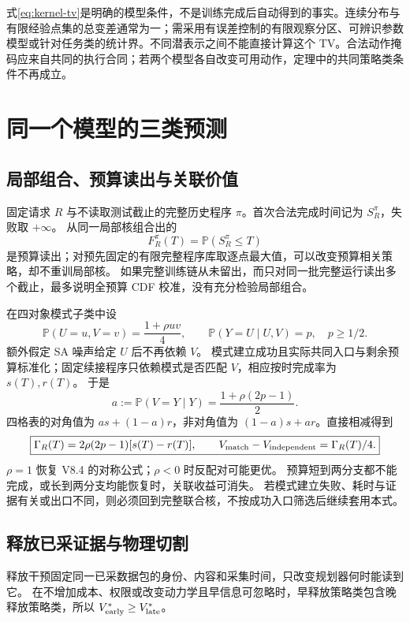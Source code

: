 \documentclass[11pt,a4paper,fontset=fandol]{ctexart}
\theoremstyle{definition}
\theoremstyle{remark}
\numberwithin{equation}{section}
\newcommand{\Pp}{\mathbb P}
\begin{document}
\begin{scopebox}
式\eqref{eq:kernel-tv}是明确的模型条件，不是训练完成后自动得到的事实。连续分布与有限经验点集的总变差通常为一；需采用有误差控制的有限观察分区、可辨识参数模型或针对任务类的统计界。不同潜表示之间不能直接计算这个 TV。合法动作掩码应来自共同的执行合同；若两个模型各自改变可用动作，定理中的共同策略类条件不再成立。
\end{scopebox}


\section{同一个模型的三类预测}
\label{sec:budget}
\subsection{局部组合、预算读出与关联价值}
固定请求 $R$ 与不读取测试截止的完整历史程序 $\pi$。首次合法完成时间记为 $S_R^\pi$，失败取 $+\infty$。
从同一局部核组合出的
\[
 F_R^\pi(T)=\Pp(S_R^\pi\le T)
\]
是预算读出；对预先固定的有限完整程序库取逐点最大值，可以改变预算相关策略，却不重训局部核。
如果完整训练链从未留出，而只对同一批完整运行读出多个截止，最多说明全预算 CDF 校准，没有充分检验局部组合。

在四对象模式子类中设
\begin{equation}
 \Pp(U=u,V=v)=\frac{1+\rho uv}{4},\qquad
 \Pp(Y=U\mid U,V)=p,\quad p\ge1/2 .
 \label{eq:rho-model}
\end{equation}
额外假定 SA 噪声给定 $U$ 后不再依赖 $V$。
模式建立成功且实际共同入口与剩余预算标准化；固定续接程序只依赖模式是否匹配 $V$，相应按时完成率为 $s(T),r(T)$。
于是
\[
 a:=\Pp(V=Y\mid Y)=\frac{1+\rho(2p-1)}2.
\]
四格表的对角值为 $a s+(1-a)r$，非对角值为 $(1-a)s+a r$。直接相减得到
\begin{equation}
 \boxed{\Gamma_R(T)=2\rho(2p-1)[s(T)-r(T)],\qquad
 V_{\rm match}-V_{\rm independent}=\Gamma_R(T)/4.}
 \label{eq:rho-product}
\end{equation}
$\rho=1$ 恢复 V8.4 的对称公式；$\rho<0$ 时反配对可能更优。
预算短到两分支都不能完成，或长到两分支均能恢复时，关联收益可消失。
若模式建立失败、耗时与证据有关或出口不同，则必须回到完整联合核，不按成功入口筛选后继续套用本式。

\subsection{释放已采证据与物理切割}
\label{sec:timing}
释放干预固定同一已采数据包的身份、内容和采集时间，只改变规划器何时能读到它。
在不增加成本、权限或改变动力学且早信息可忽略时，早释放策略类包含晚释放策略类，所以
$V_{\rm early}^*\ge V_{\rm late}^*$。
\end{document}
